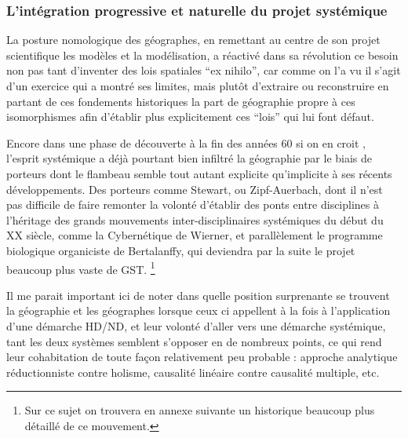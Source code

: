 
\subsubsection{L'intégration progressive et naturelle du projet systémique}
\label{sssec:progressive_systemique}

La posture nomologique des géographes, en remettant au centre de son projet scientifique les modèles et la modélisation, a réactivé dans sa révolution ce besoin non pas tant d'inventer des lois spatiales \foreignquote{latin}{ex nihilo}, car comme on l'a vu il s'agit d'un exercice qui a montré ses limites, mais plutôt d'extraire ou reconstruire en partant de ces fondements historiques la part de géographie propre à ces isomorphismes afin d'établir plus explicitement ces \enquote{lois} qui lui font défaut.

Encore dans une phase de découverte à la fin des années 60 si on en croit \textcite{Harvey1969}, l'esprit systémique \textcite{Ackerman1963} a déjà pourtant bien infiltré la géographie par le biais de porteurs dont le flambeau semble tout autant explicite qu'implicite à ses récents développements. Des porteurs comme Stewart, ou Zipf-Auerbach, dont il n'est pas difficile de faire remonter la volonté d'établir des ponts entre disciplines à l'héritage des grands mouvements inter-disciplinaires systémiques du début du XX siècle, comme la Cybernétique de Wierner, et parallèlement le programme biologique organiciste de Bertalanffy, qui deviendra par la suite le projet beaucoup plus vaste de GST. \footnote{Sur ce sujet on trouvera en annexe suivante un historique beaucoup plus détaillé de ce mouvement.}

Il me parait important ici de noter dans quelle position surprenante se trouvent la géographie et les géographes lorsque ceux ci appellent à la fois à l'application d'une démarche HD/ND, et leur volonté d'aller vers une démarche systémique, tant les deux systèmes semblent s'opposer en de nombreux points, ce qui rend leur cohabitation de toute façon relativement peu probable : approche analytique réductionniste contre holisme, causalité linéaire contre causalité multiple, etc.

